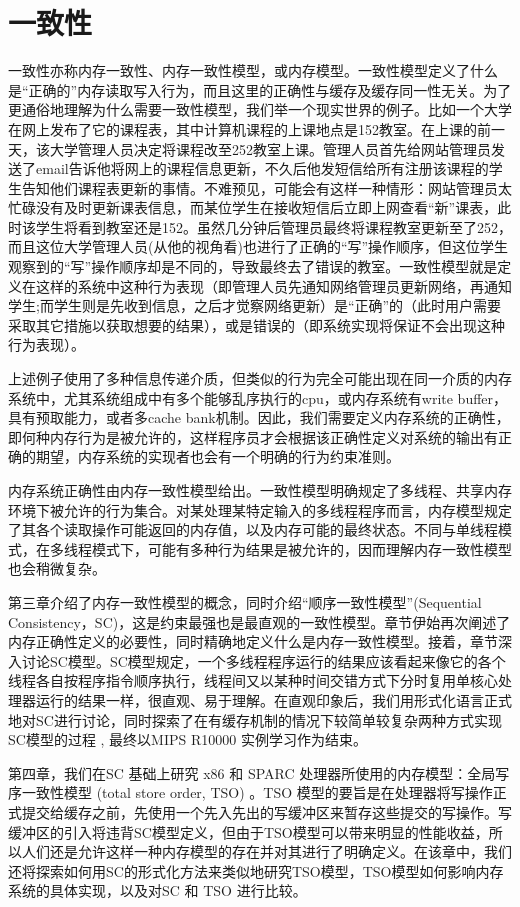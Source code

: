 \documentclass[UTF-8]{ctexrep}
\begin{document}
\section{一致性}
\par 一致性亦称内存一致性、内存一致性模型，或内存模型。一致性模型定义了什么是“正确的”内存读取写入行为，而且这里的正确性与缓存及缓存同一性无关。为了更通俗地理解为什么需要一致性模型，我们举一个现实世界的例子。比如一个大学在网上发布了它的课程表，其中计算机课程的上课地点是152教室。在上课的前一天，该大学管理人员决定将课程改至252教室上课。管理人员首先给网站管理员发送了email告诉他将网上的课程信息更新，不久后他发短信给所有注册该课程的学生告知他们课程表更新的事情。不难预见，可能会有这样一种情形：网站管理员太忙碌没有及时更新课表信息，而某位学生在接收短信后立即上网查看“新”课表，此时该学生将看到教室还是152。虽然几分钟后管理员最终将课程教室更新至了252，而且这位大学管理人员(从他的视角看)也进行了正确的“写”操作顺序，但这位学生观察到的“写”操作顺序却是不同的，导致最终去了错误的教室。一致性模型就是定义在这样的系统中这种行为表现（即管理人员先通知网络管理员更新网络，再通知学生;而学生则是先收到信息，之后才觉察网络更新）是“正确”的（此时用户需要采取其它措施以获取想要的结果），或是错误的（即系统实现将保证不会出现这种行为表现）。
\par 上述例子使用了多种信息传递介质，但类似的行为完全可能出现在同一介质的内存系统中，尤其系统组成中有多个能够乱序执行的cpu，或内存系统有write buffer，具有预取能力，或者多cache bank机制。因此，我们需要定义内存系统的正确性，即何种内存行为是被允许的，这样程序员才会根据该正确性定义对系统的输出有正确的期望，内存系统的实现者也会有一个明确的行为约束准则。
\par 内存系统正确性由内存一致性模型给出。一致性模型明确规定了多线程、共享内存环境下被允许的行为集合。对某处理某特定输入的多线程程序而言，内存模型规定了其各个读取操作可能返回的内存值，以及内存可能的最终状态。不同与单线程模式，在多线程模式下，可能有多种行为结果是被允许的，因而理解内存一致性模型也会稍微复杂。
\par 第三章介绍了内存一致性模型的概念，同时介绍“顺序一致性模型”(Sequential Consistency，SC)，这是约束最强也是最直观的一致性模型。章节伊始再次阐述了内存正确性定义的必要性，同时精确地定义什么是内存一致性模型。接着，章节深入讨论SC模型。SC模型规定，一个多线程程序运行的结果应该看起来像它的各个线程各自按程序指令顺序执行，线程间又以某种时间交错方式下分时复用单核心处理器运行的结果一样，很直观、易于理解。在直观印象后，我们用形式化语言正式地对SC进行讨论，同时探索了在有缓存机制的情况下较简单较复杂两种方式实现SC模型的过程 , 最终以MIPS R10000 实例学习作为结束。
\par 第四章，我们在SC 基础上研究 x86 和 SPARC 处理器所使用的内存模型：全局写序一致性模型 (total store order, TSO) 。TSO 模型的要旨是在处理器将写操作正式提交给缓存之前，先使用一个先入先出的写缓冲区来暂存这些提交的写操作。写缓冲区的引入将违背SC模型定义，但由于TSO模型可以带来明显的性能收益，所以人们还是允许这样一种内存模型的存在并对其进行了明确定义。在该章中，我们还将探索如何用SC的形式化方法来类似地研究TSO模型，TSO模型如何影响内存系统的具体实现，以及对SC 和 TSO 进行比较。
\end{document}
